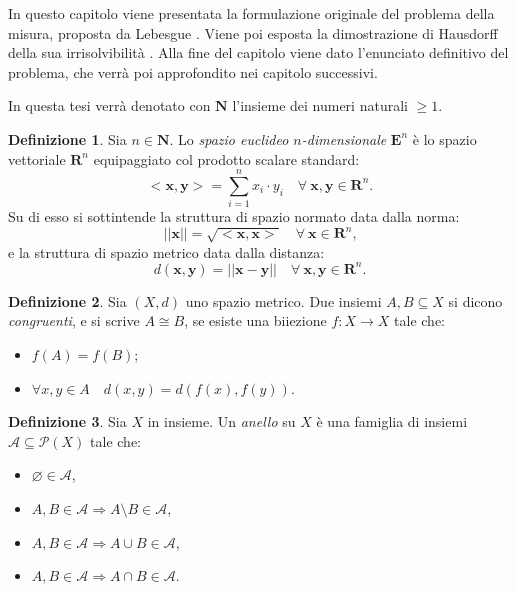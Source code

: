 \documentclass[a4paper,oneside,11pt]{book}
\theoremstyle{definition} \newtheorem{Def}{Definizione}
\theoremstyle{plain} \newtheorem{teo}{Teorema}
\theoremstyle{plain} \newtheorem{cor}[teo]{Corollario}
\theoremstyle{definition} \newtheorem{lem}[teo]{Lemma}
\theoremstyle{plain} \newtheorem{pro}[teo]{Proposizione}
\begin{document}
	In questo capitolo viene presentata la formulazione originale del problema della misura, proposta da Lebesgue \cite{lebesgue}. Viene poi esposta la dimostrazione di Hausdorff della sua irrisolvibilità \cite{felix}. Alla fine del capitolo viene dato l'enunciato definitivo del problema, che verrà poi approfondito nei capitolo successivi.
	
	\bigskip
	In questa tesi verrà denotato con $\mathbf{N}$ l'insieme dei numeri naturali $\geq 1$.
	\bigskip
	
	\begin{Def}
		Sia $n \in \mathbf{N}$. Lo \emph{spazio euclideo $n$-dimensionale} $\mathbf{E}^n$ è lo spazio vettoriale $\mathbf{R}^n$ equipaggiato col prodotto scalare standard:
		\begin{equation*}
			<\mathbf{x}, \mathbf{y}> = \sum_{i=1}^n x_i \cdot y_i \quad \forall\ \mathbf{x}, \mathbf{y} \in \mathbf{R}^n \text{.}
		\end{equation*}
		Su di esso si sottintende la struttura di spazio normato data dalla norma:
		\begin{equation*}
			||\mathbf{x}|| =  \sqrt{<\mathbf{x}, \mathbf{x}>} \quad \forall\ \mathbf{x} \in \mathbf{R}^n \text{,}
		\end{equation*}
		e la struttura di spazio metrico data dalla distanza:
		\begin{equation*}
			d(\mathbf{x}, \mathbf{y}) = ||\mathbf{x} - \mathbf{y}|| \quad \forall\ \mathbf{x}, \mathbf{y} \in \mathbf{R}^n \text{.}
		\end{equation*}
	\end{Def}
	
	\begin{Def}
		Sia $(X,d)$ uno spazio metrico. Due insiemi $A, B \subseteq X$ si dicono \emph{congruenti}, e si scrive $A \cong B$, se esiste una biiezione $f:X \to X$ tale che:
		\begin{itemize}
			\item $f(A) = f(B)$;
			\item $\forall x, y \in A \quad d(x,y) = d(f(x), f(y))$.
		\end{itemize}
	\end{Def}
	
	\begin{Def}\label{anello}
		Sia $X$ in insieme. Un \emph{anello} su $X$ è una famiglia di insiemi $\mathcal{A} \subseteq \mathcal{P}(X)$ tale che:
		\begin{itemize}
			\item $\varnothing \in \mathcal{A}$,
			\item $A,B\in \mathcal{A} \Rightarrow A \setminus B\in\mathcal{A}$,
			\item $A,B\in \mathcal{A} \Rightarrow A \cup B\in\mathcal{A}$,
			\item $A,B\in \mathcal{A} \Rightarrow A \cap B\in\mathcal{A}$.
		\end{itemize}
	\end{Def}
	
\end{document}
